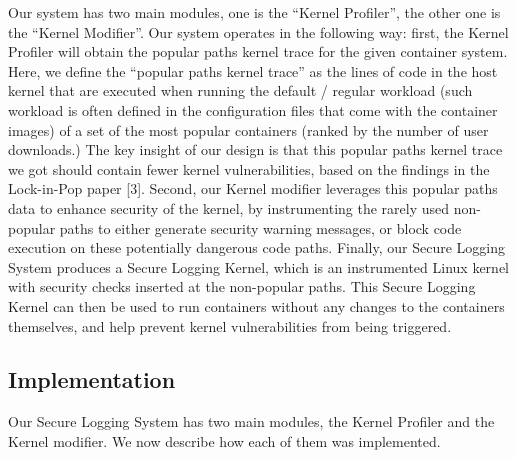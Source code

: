 Our system has two main modules, one is the ``Kernel Profiler'', the other one is the ``Kernel Modifier''. 
Our system operates in the following way: first, the Kernel Profiler will obtain the popular paths kernel trace for the given container system. 
Here, we define the ``popular paths kernel trace'' as the lines of code in the host kernel that are executed when running the default / regular workload 
(such workload is often defined in the configuration files that come with the container images) of a set of the most popular containers 
(ranked by the number of user downloads.) The key insight of our design is that this popular paths kernel trace we got should contain fewer kernel vulnerabilities, 
based on the findings in the Lock-in-Pop paper [3]. Second, our Kernel modifier leverages this popular paths data to enhance security of the kernel, 
by instrumenting the rarely used non-popular paths to either generate security warning messages, or block code execution on these potentially dangerous code paths. 
Finally, our Secure Logging System produces a Secure Logging Kernel, which is an instrumented Linux kernel with security checks inserted at the non-popular paths. 
This Secure Logging Kernel can then be used to run containers without any changes to the containers themselves, and help prevent kernel vulnerabilities from being triggered. 

\subsection{Implementation}
\label{sec.design.implementation}
Our Secure Logging System has two main modules, the Kernel Profiler and the Kernel modifier. We now describe how each of them was implemented. 


